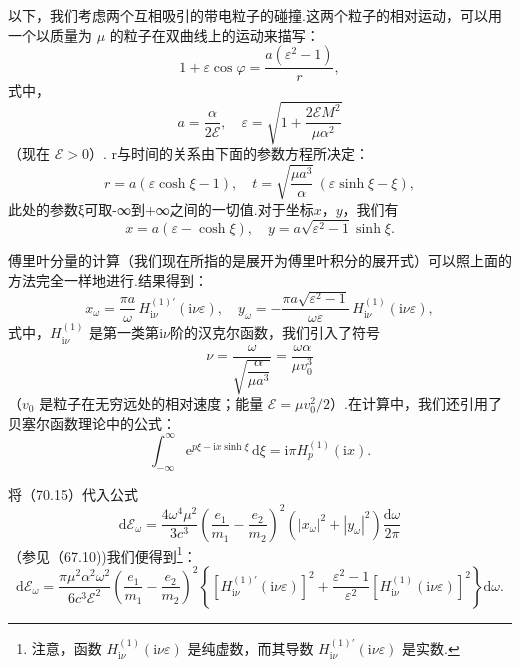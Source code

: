 以下，我们考虑两个互相吸引的带电粒子的碰撞.这两个粒子的相对运动，可以用一个以质量为 $\mu$ 的粒子在双曲线上的运动来描写：
\begin{equation}
  1+\varepsilon\cos\varphi=\frac{a(\varepsilon^2-1)}{r},
\end{equation}
式中，
\begin{equation}
  a=\frac{\alpha}{2\mathcal{E}},\quad
  \varepsilon=\sqrt{1+\frac{2\mathcal{E}M^2}{\mu\alpha^2}}
\end{equation}
（现在 $\mathcal{E}>0$）. r与时间的关系由下面的参数方程所决定：
\begin{equation}
  r=a(\varepsilon\cosh\xi-1),\quad
  t=\sqrt{\frac{\mu a^3}{\alpha}}\,(\varepsilon\sinh\xi-\xi),
\end{equation}
此处的参数ξ可取-∞到+∞之间的一切值.对于坐标$x$，$y$，我们有
\begin{equation}
  x=a(\varepsilon-\cosh\xi),\quad
  y=a\sqrt{\varepsilon^2-1}\sinh\xi.
\end{equation}

傅里叶分量的计算（我们现在所指的是展开为傅里叶积分的展开式）可以照上面的方法完全一样地进行.结果得到：
\begin{equation}
  x_\omega=\frac{\pi a}{\omega}\,H_{\mathrm{i}\nu}^{(1)\prime}(\mathrm{i}\nu\varepsilon),\quad
  y_\omega=-\frac{\pi a\sqrt{\varepsilon^2-1}}{\omega\varepsilon}\,H_{\mathrm{i}\nu}^{(1)}(\mathrm{i}\nu\varepsilon),
\end{equation}
式中，$H_{\mathrm{i}\nu}^{(1)}$ 是第一类第$\mathrm{i}\nu$阶的汉克尔函数，我们引入了符号
\begin{equation}
  \nu=\frac{\omega}{\sqrt{\dfrac{\alpha}{\mu a^3}}}=\frac{\omega\alpha}{\mu v_0^3}
\end{equation}
（$v_0$ 是粒子在无穷远处的相对速度；能量 $\mathcal{E}=\mu v_0^2/2$）.在计算中，我们还引用了贝塞尔函数理论中的公式：
\begin{equation}
  \int_{-\infty}^{\infty}\mathrm{e}^{p\xi-\mathrm{i}x\sinh\xi}\,\mathrm{d}\xi=\mathrm{i}\pi H_p^{(1)}(\mathrm{i}x).
\end{equation}

将（70.15）代入公式
\begin{equation*}
  \mathrm{d}\mathcal{E}_\omega=\frac{4\omega^4\mu^2}{3c^3}\left(\frac{e_1}{m_1}-\frac{e_2}{m_2}\right)^2\left(|x_\omega|^2+|y_\omega|^2\right)\frac{\mathrm{d}\omega}{2\pi}
\end{equation*}
（参见（67.10))我们便得到\footnote{注意，函数 $H_{\mathrm{i}\nu}^{(1)}(\mathrm{i}\nu\varepsilon)$ 是纯虚数，而其导数 $H_{\mathrm{i}\nu}^{(1)\prime}(\mathrm{i}\nu\varepsilon)$ 是实数.}：
\begin{equation}
  \mathrm{d}\mathcal{E}_\omega=\frac{\pi\mu^2\alpha^2\omega^2}{6c^3\mathcal{E}^2}\left(\frac{e_1}{m_1}-\frac{e_2}{m_2}\right)^2
  \left\{\left[H_{\mathrm{i}\nu}^{(1)\prime}(\mathrm{i}\nu\varepsilon)\right]^2
  +\frac{\varepsilon^2-1}{\varepsilon^2}\left[H_{\mathrm{i}\nu}^{(1)}(\mathrm{i}\nu\varepsilon)\right]^2\right\}\mathrm{d}\omega.
\end{equation}

